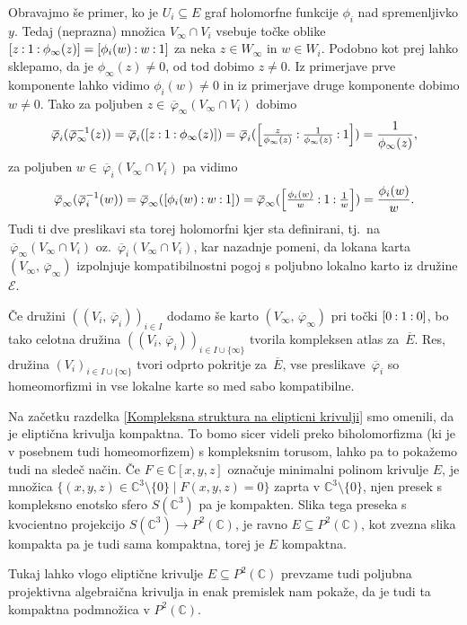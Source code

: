 \documentclass[mat1]{fmfdelo}
\numberwithin{equation}{section}
\newcommand{\C}{\mathbb C}
\newcommand{\PC}{P^2(\mathbb C)}
\newcommand{\inv}{^{-1}}
\newcommand{\pcoor}[1]{%
\begingroup\lccode`~=`: \lowercase{\endgroup
\edef~}{\mathbin{\mathchar\the\mathcode`:}\nobreak}%
\left[%
\begingroup
\mathcode`:=\string"8000
#1%
\endgroup
\right]%
}
\newcommand{\olsi}[1]{\,\overline{\!{#1}}} %
\newcommand{\tj}{tj.\ }
\theoremstyle{definition}
\begin{document}
Obravajmo še primer, ko je $U_i \subseteq E$ graf holomorfne funkcije $\phi_i$ nad spremenljivko $y$. Tedaj (neprazna) množica $V_\infty \cap V_i$ vsebuje točke oblike $\pcoor{z : 1 : \phi_\infty(z)} = \pcoor{\phi_i(w) : w : 1}$ za neka $z \in W_\infty$ in $w \in W_i$. Podobno kot prej lahko sklepamo, da je $\phi_\infty(z) \neq 0$, od tod dobimo $z \neq 0$. Iz primerjave prve komponente lahko vidimo $\phi_i(w) \neq 0$ in iz primerjave druge komponente dobimo $w \neq 0$. Tako za poljuben $z \in \olsi{\varphi}_\infty(V_\infty \cap V_i)$ dobimo
\[
    \olsi{\varphi}_i (\olsi{\varphi}_\infty\inv (z)) = 
    \olsi{\varphi}_i (\pcoor{z : 1 : \phi_\infty(z)}) = 
    \olsi{\varphi}_i (\pcoor{\tfrac{z}{\phi_\infty(z)} : \tfrac{1}{\phi_\infty(z)} : 1}) = 
    \frac{1}{\phi_\infty(z)},
\]
za poljuben $w \in \olsi{\varphi}_i(V_\infty \cap V_i)$ pa vidimo
\[
    \olsi{\varphi}_\infty (\olsi{\varphi}_i\inv(w)) =
    \olsi{\varphi}_\infty (\pcoor{\phi_i(w) : w : 1}) =
    \olsi{\varphi}_\infty (\pcoor{\tfrac{\phi_i(w)}{w} : 1 : \tfrac{1}{w}}) = 
    \frac{\phi_i(w)}{w}.
\]
Tudi ti dve preslikavi sta torej holomorfni kjer sta definirani, \tj na $\olsi{\varphi}_\infty(V_\infty \cap V_i)$ oz. $\olsi{\varphi}_i(V_\infty \cap V_i)$, kar nazadnje pomeni, da lokana karta $(V_\infty, \olsi{\varphi}_\infty)$ izpolnjuje kompatibilnostni pogoj s poljubno lokalno karto iz družine $\mathcal{E}$.

Če družini $((V_i, \olsi{\varphi}_i))_{i \in I}$ dodamo še karto $(V_\infty, \olsi{\varphi}_\infty)$ pri točki $\pcoor{0 : 1 : 0}$, bo tako celotna družina $((V_i,\olsi{\varphi}_i))_{i \in I \cup \{\infty\}}$ tvorila kompleksen atlas za $\olsi{E}$. Res, družina $(V_i)_{i \in I \cup \{\infty\}}$ tvori odprto pokritje za $\olsi{E}$, vse preslikave $\olsi{\varphi}_i$ so homeomorfizmi in vse lokalne karte so med sabo kompatibilne. 

\begin{opomba}
    Na začetku razdelka \ref{Kompleksna struktura na elipticni krivulji} smo omenili, da je eliptična krivulja kompaktna. To bomo sicer videli preko biholomorfizma (ki je v posebnem tudi homeomorfizem) s kompleksnim torusom, lahko pa to pokažemo tudi na sledeč način. Če $F \in \C[x,y,z]$ označuje minimalni polinom krivulje $E$, je množica $\{ (x,y,z) \in \C^3\setminus\{0\} \mid F(x,y,z) = 0\}$ zaprta v $\C^3\setminus\{0\}$, njen presek s kompleksno enotsko sfero $S(\C^3)$ pa je kompakten. Slika tega preseka s kvocientno projekcijo $S(\C^3) \to \PC$, je ravno $E\subseteq \PC$, kot zvezna slika kompakta pa je tudi sama kompaktna, torej je $E$ kompaktna. 
    
    Tukaj lahko vlogo eliptične krivulje $E \subseteq \PC$ prevzame tudi poljubna projektivna algebraična krivulja in enak premislek nam pokaže, da je tudi ta kompaktna podmnožica v $\PC$.
\end{opomba}
\end{document}
